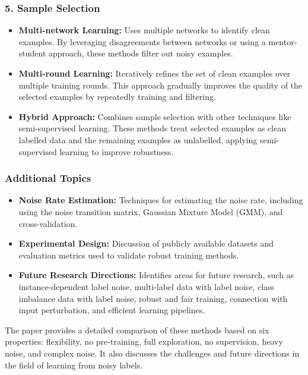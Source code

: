 \subsubsection*{5. Sample Selection}
\begin{itemize}
    \item \textbf{Multi-network Learning:} Uses multiple networks to identify clean examples. By leveraging disagreements between networks or using a mentor-student approach, these methods filter out noisy examples.
    \item \textbf{Multi-round Learning:} Iteratively refines the set of clean examples over multiple training rounds. This approach gradually improves the quality of the selected examples by repeatedly training and filtering.
    \item \textbf{Hybrid Approach:} Combines sample selection with other techniques like semi-supervised learning. These methods treat selected examples as clean labelled data and the remaining examples as unlabelled, applying semi-supervised learning to improve robustness.
\end{itemize}

\subsubsection*{Additional Topics}
\begin{itemize}
    \item \textbf{Noise Rate Estimation:} Techniques for estimating the noise rate, including using the noise transition matrix, Gaussian Mixture Model (GMM), and cross-validation.
    \item \textbf{Experimental Design:} Discussion of publicly available datasets and evaluation metrics used to validate robust training methods.
    \item \textbf{Future Research Directions:} Identifies areas for future research, such as instance-dependent label noise, multi-label data with label noise, class imbalance data with label noise, robust and fair training, connection with input perturbation, and efficient learning pipelines.
\end{itemize}

The paper provides a detailed comparison of these methods based on six properties: flexibility, no pre-training, full exploration, no supervision, heavy noise, and complex noise. It also discusses the challenges and future directions in the field of learning from noisy labels.
\newline

